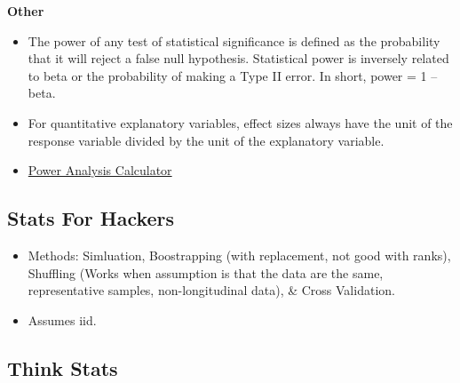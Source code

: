 \documentclass[]{book}
\begin{document}
\textbf{Other}

\begin{itemize}
\item
  The power of any test of statistical significance is defined as the
  probability that it will reject a false null hypothesis. Statistical
  power is inversely related to beta or the probability of making a Type
  II error. In short, power = 1 -- beta.
\item
  For quantitative explanatory variables, effect sizes always have the
  unit of the response variable divided by the unit of the explanatory
  variable.
\item
  \href{http://www.evanmiller.org/ab-testing/sample-size.html}{Power
  Analysis Calculator}
\end{itemize}

\subsection{Stats For Hackers}\label{stats-for-hackers}

\begin{itemize}
\item
  Methods: Simluation, Boostrapping (with replacement, not good with
  ranks), Shuffling (Works when assumption is that the data are the
  same, representative samples, non-longitudinal data), \& Cross
  Validation.
\item
  Assumes iid.
\end{itemize}

\subsection{Think Stats}\label{think-stats}
\end{document}
